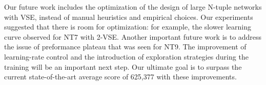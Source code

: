 Our future work includes the optimization of the design of large N-tuple networks with VSE, instead of manual heuristics and empirical choices.
Our experiments suggested that there is room for optimization: for example, the slower learning curve observed for NT7 with 2-VSE.
Another important future work is to address the issue of preformance plateau that was seen for NT9.
The improvement of learning-rate control and the introduction of exploration strategies during the training will be an important next step.
Our ultimate goal is to surpass the current state-of-the-art average score of 625,377 with these improvements.


